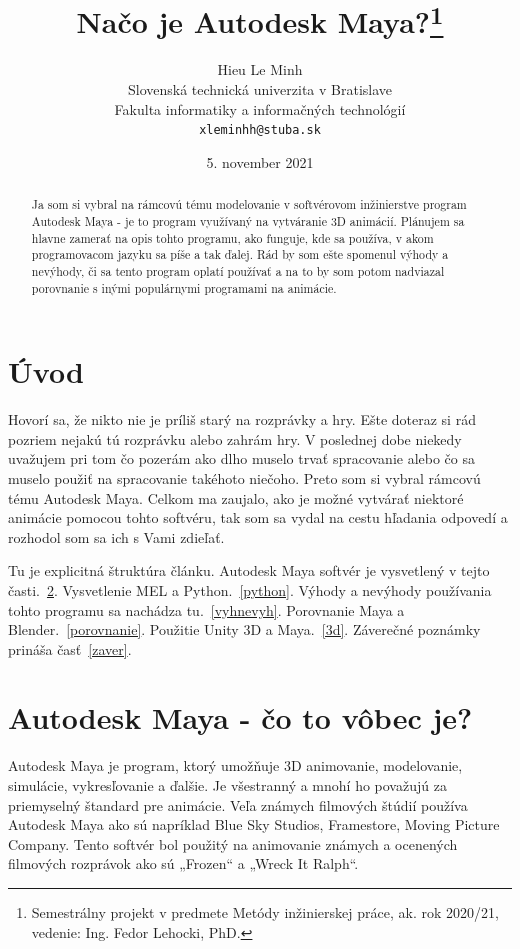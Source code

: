 \documentclass[10pt,oneside,slovak,a4paper]{article}
\title{Načo je Autodesk Maya?\thanks{Semestrálny projekt v predmete Metódy inžinierskej práce, ak. rok 2020/21, vedenie: Ing. Fedor Lehocki, PhD.}}
\author{Hieu Le Minh\\[2pt]
	{\small Slovenská technická univerzita v Bratislave}\\
	{\small Fakulta informatiky a informačných technológií}\\
	{\small \texttt{xleminhh@stuba.sk}}
	}
\date{\small 5. november 2021}
\begin{document}
\maketitle

\begin{abstract}
Ja som si vybral na rámcovú tému modelovanie v softvérovom inžinierstve program Autodesk Maya
- je to program využívaný na vytváranie 3D animácií. 
Plánujem sa hlavne zamerať na opis tohto programu, ako funguje, kde sa používa, v akom 
programovacom jazyku sa píše a tak ďalej. Rád by som ešte spomenul výhody a nevýhody, či 
sa tento program oplatí používať a na to by som potom nadviazal porovnanie s inými populárnymi programami na animácie.
\end{abstract}



\section{Úvod}

Hovorí sa, že nikto nie je príliš starý na rozprávky a hry. Ešte doteraz si rád pozriem nejakú tú rozprávku alebo zahrám hry. V poslednej dobe niekedy uvažujem pri tom čo pozerám ako dlho muselo trvať spracovanie alebo čo sa muselo použiť na spracovanie takéhoto niečoho. Preto som si vybral rámcovú tému Autodesk Maya. Celkom ma zaujalo, ako je možné vytvárať niektoré animácie pomocou tohto softvéru, tak som sa vydal na cestu hľadania odpovedí a rozhodol som sa ich s Vami zdieľať.

Tu je explicitná štruktúra článku.
Autodesk Maya softvér je vysvetlený v tejto časti.~\ref{AM}.
Vysvetlenie MEL a Python.~\ref{python}.
Výhody a nevýhody používania tohto programu sa nachádza tu.~\ref{vyhnevyh}.
Porovnanie Maya a Blender.~\ref{porovnanie}.
Použitie Unity 3D a Maya.~\ref{3d}.
Záverečné poznámky prináša časť~\ref{zaver}.



\section{Autodesk Maya - čo to vôbec je?} \label{AM}

Autodesk Maya je program, ktorý umožňuje 3D animovanie, modelovanie, simulácie, vykresľovanie a ďalšie. Je všestranný a mnohí ho považujú za priemyselný štandard pre animácie. Veľa známych filmových štúdií používa Autodesk Maya ako sú napríklad Blue Sky Studios, Framestore, Moving Picture Company. Tento softvér bol použitý na animovanie známych a ocenených filmových rozprávok ako sú „Frozen“ a „Wreck It Ralph“.\\
\end{document}

